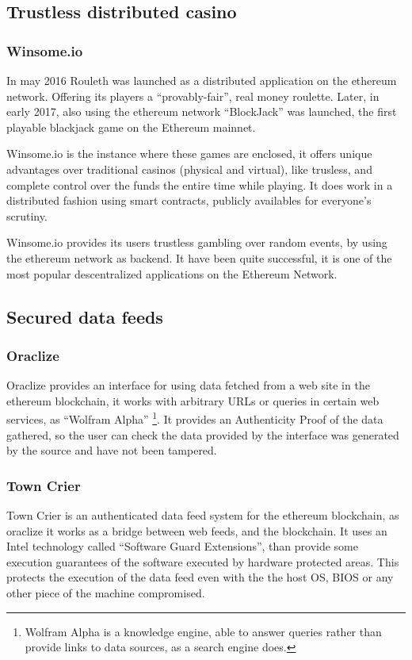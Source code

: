 \subsection{Trustless distributed casino}

\subsubsection{Winsome.io}
In may 2016 Rouleth\cite{winsomeio} was launched as a distributed application
  on the ethereum network. Offering its players a ``provably-fair'', real money
  roulette.
Later, in early 2017, also using the ethereum network ``BlockJack'' was
  launched, the first playable blackjack game on the Ethereum mainnet.

Winsome.io is the instance where these games are enclosed, it offers unique
  advantages over traditional casinos (physical and virtual), like trusless,
  and complete control over the funds the entire time while playing. It does
  work in a distributed fashion using smart contracts, publicly availables
  for everyone's scrutiny.

Winsome.io provides its users trustless gambling over random events, by using
  the ethereum network as backend. It have been quite successful, it is one
  of the most popular descentralized applications on the Ethereum Network.

\subsection{Secured data feeds}

\subsubsection{Oraclize}
Oraclize\cite{oraclizeit} provides an interface for using data fetched from a
  web site in the ethereum blockchain, it works with arbitrary URLs or queries
  in certain web services, as ``Wolfram Alpha'' \footnote{Wolfram Alpha is a
  knowledge engine, able to answer queries rather than provide links to data
  sources, as a search engine does.}.
It provides an Authenticity Proof of the data gathered, so the user can check
  the data provided by the interface was generated by the source and have not
  been tampered.

\subsubsection{Town Crier}
Town Crier\cite{zhang2016town} is an authenticated data feed system for
  the ethereum blockchain, as oraclize it works as a bridge between web feeds,
  and the blockchain. It uses an Intel technology called ``Software Guard
  Extensions''\cite{costan2016intel}, than provide some execution guarantees of
  the software executed by hardware protected areas. This protects the execution
  of the data feed even with the the host OS, BIOS or any other piece of the
  machine compromised.
